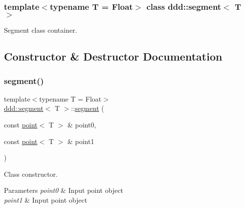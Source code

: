 \subsubsection*{template$<$typename T = Float$>$\newline
class ddd\+::segment$<$ T $>$}

Segment class container. 

\subsection{Constructor \& Destructor Documentation}
\mbox{\label{classddd_1_1segment_afdfcc983efc30b3dee0af2603795775b}} 
\subsubsection{\texorpdfstring{segment()}{segment()}\hspace{0.1cm}{\footnotesize\ttfamily [1/2]}}
{\footnotesize\ttfamily template$<$typename T = Float$>$ \\
\hyperlink{classddd_1_1segment}{ddd\+::segment}$<$ T $>$\+::\hyperlink{classddd_1_1segment}{segment} (\begin{DoxyParamCaption}\item[{const \hyperlink{classddd_1_1point}{point}$<$ T $>$ \&}]{point0,  }\item[{const \hyperlink{classddd_1_1point}{point}$<$ T $>$ \&}]{point1 }\end{DoxyParamCaption})\hspace{0.3cm}{\ttfamily [inline]}}



Class constructor. 


\begin{DoxyParams}{Parameters}
{\em point0} & Input point object \\
\hline
{\em point1} & Input point object \\
\hline
\end{DoxyParams}
\mbox{\label{classddd_1_1segment_aa4e3b31e4400f99cbf459626518dab2f}} 
